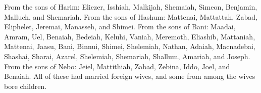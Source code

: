 \begin{biblechapter}
\verse From the sons of Harim: Eliezer, Isshiah, Malkijah, Shemaiah, Simeon,
\verse Benjamin, Malluch, and Shemariah.
\verse From the sons of Hashum: Mattenai, Mattattah, Zabad, Eliphelet, Jeremai, Manasseh, and Shimei.
\verse From the sons of Bani: Maadai, Amram, Uel,
\verse Benaiah, Bedeiah, Keluhi,
\verse Vaniah, Meremoth, Eliashib,
\verse Mattaniah, Mattenai, Jaasu,
\verse Bani, Binnui, Shimei,
\verse Shelemiah, Nathan, Adaiah,
\verse Macnadebai, Shashai, Sharai,
\verse Azarel, Shelemiah, Shemariah,
\verse Shallum, Amariah, and Joseph.
\verse From the sons of Nebo: Jeiel, Mattithiah, Zabad, Zebina, Iddo, Joel, and Benaiah.
\verse All of these had married foreign wives, and some from among the wives bore children.
\end{biblechapter}


